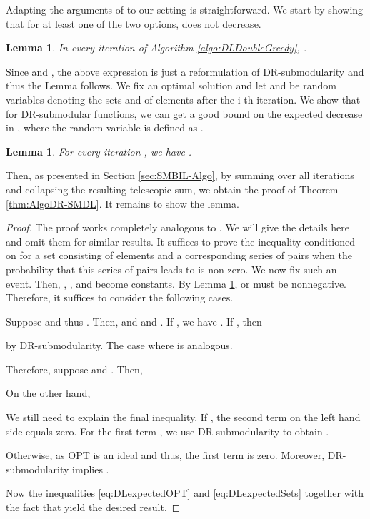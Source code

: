\documentclass{article}
\theoremstyle{plain}
\newtheorem{lemma}[theorem]{Lemma}
\theoremstyle{definition}
\begin{document}
Adapting the arguments of \cite{DoubleGreedy} to our setting is straightforward. 
We start by showing that for at least one of the two options,  does not decrease.  
\begin{lemma}\label{lemma:DLpositivechange}
In every iteration of Algorithm \ref{algo:DLDoubleGreedy}, . 
\end{lemma}
Since  and , the above expression is just a reformulation of DR-submodularity and thus the Lemma follows. 
We fix an optimal solution  and let  and  be random variables denoting the sets  and  of elements after the i-th iteration. 
We show that for DR-submodular functions, we can get a good bound on the expected decrease in , where the random variable 
 is defined as . 

\begin{lemma}
For every iteration , we have . 
\end{lemma}
Then, as presented in Section \ref{sec:SMBIL-Algo}, by summing over all iterations and collapsing the resulting telescopic sum, 
we obtain the proof of Theorem \ref{thm:AlgoDR-SMDL}. 
It remains to show the lemma. 
\begin{proof}
The proof works completely analogous to \cite{DoubleGreedy}. We will give the details here and omit them for similar results. 
It suffices to prove the inequality conditioned on  for a set  consisting of elements
 and a corresponding series of pairs  when the probability that this
series of pairs leads to  is non-zero. We now fix such an event.
Then, , ,  and  become constants. 
By Lemma \ref{lemma:DLpositivechange},  or  must be nonnegative. 
Therefore, it suffices to consider the following cases. 

Suppose  and thus . Then,  and  and 
.
If , we have .   
If , then 


by DR-submodularity. 
The case where  is analogous.

Therefore, suppose  and . 
Then, 
						  

On the other hand, 


We still need to explain the final inequality. 
If , the second term on the left hand side equals zero. For the first term , we use DR-submodularity to obtain
. 

Otherwise,  as OPT is an ideal and thus, the first term is zero. Moreover, 
DR-submodularity implies   
.

Now the inequalities \eqref{eq:DLexpectedOPT} and \eqref{eq:DLexpectedSets} together with the fact that 
 yield the desired result. 
\end{proof}
\end{document}
